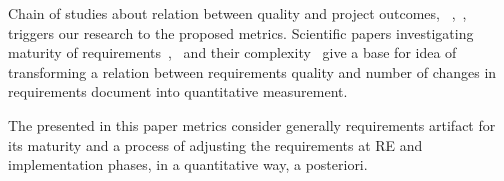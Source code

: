 Chain of studies about relation between quality and project outcomes, ~\cite{Verner:2005},~\cite{Kamata:2007},~\cite{Noorwali:2015} triggers our research to the proposed metrics. Scientific papers investigating maturity of requirements~\cite{Basili:1981},~\cite{FARBEY:1990} and their complexity~\cite{Antinyan:2016} give a base for idea of transforming a relation between requirements quality and number of changes in requirements document into quantitative measurement.

The presented in this paper metrics consider generally requirements artifact for its maturity and a process 
of adjusting the requirements at RE and implementation phases, in a quantitative way, a posteriori.

%
%
%
